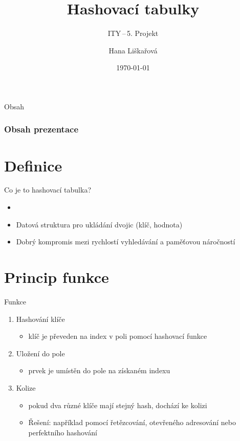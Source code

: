 \documentclass[10pt, hyperref={unicode}]{beamer}
\title{Hashovací tabulky}
\subtitle{ITY\,--\,5. Projekt}
\author{Hana Liškařová}
\institute
{
 Vysoké učení technické v~Brně\\
 FIT
}
\date{\today}
\begin{document}
\frame{\titlepage}

\begin{frame}{Obsah}
\frametitle{Obsah prezentace}
\tableofcontents
\end{frame}

\section{Definice}

\begin{frame}{Co je to hashovací tabulka?}
    \begin{itemize}
        \item {}
        \item Datová struktura pro ukládání dvojic \alert{(klíč, hodnota)}
        \item Dobrý kompromis mezi rychlostí vyhledávání a paměťovou náročností
    \end{itemize}
    
\end{frame}
\section{Princip funkce}

\begin{frame}{Funkce}
    \begin{enumerate}
        \item Hashování klíče
        \begin{itemize}
            \item klíč je převeden na index v poli pomocí hashovací funkce
        \end{itemize}

        \item Uložení do pole
        \begin{itemize}
            \item prvek je umístěn do pole na získaném indexu
        \end{itemize}

        \item Kolize
        \begin{itemize}
            \item pokud dva různé klíče mají stejný hash, dochází ke kolizi
            \item Řešení: například pomocí řetězcování, otevřeného adresování nebo perfektního hashování
        \end{itemize}
    \end{enumerate}
    
\end{frame}
\end{document}
